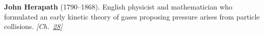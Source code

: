 \textbf{John Herapath} (1790–1868). English physicist and mathematician who formulated an early kinetic theory of gases proposing pressure arises from particle collisions. \emph{[Ch.~\hyperref[ch:negativetemperature]{28}]}

